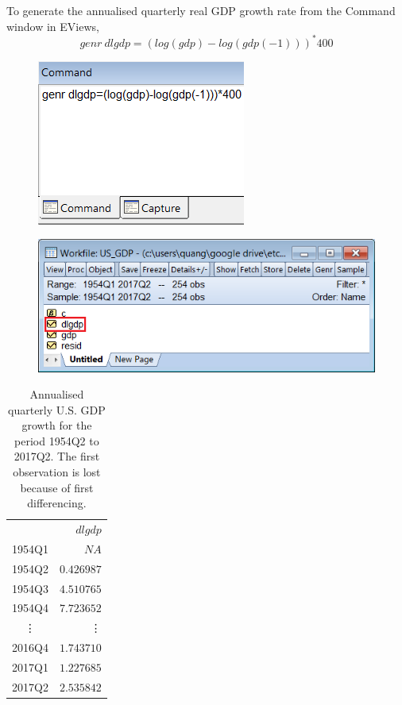 \documentclass[12pt]{report}
\begin{document}
\noindent To generate the annualised quarterly real GDP growth rate from the Command window in EViews, $$genr\ dlgdp=(log(gdp)-log(gdp(-1)))^*400$$
\begin{figure}[H]
	\centerline{\includegraphics{tute11_2}}
\end{figure}
\vspace{-\baselineskip}
\begin{figure}[H]
	\centerline{\includegraphics{tute11_3}}
\end{figure}
\vspace{-\baselineskip}


\begin{table}[H]
	\centering
	\begin{tabular}{lr}
		\multicolumn{1}{c}{}&\multicolumn{1}{r}{$dlgdp$}\\
		\multicolumn{1}{c}{1954Q1}&\multicolumn{1}{r}{$NA$}\\
		\multicolumn{1}{c}{1954Q2}&\multicolumn{1}{r}{$0.426987$}\\
		\multicolumn{1}{c}{1954Q3}&\multicolumn{1}{r}{$4.510765$}\\
		\multicolumn{1}{c}{1954Q4}&\multicolumn{1}{r}{$7.723652$}\\
		\multicolumn{1}{c}{\vdots}&\multicolumn{1}{r}{\vdots}\\
		\multicolumn{1}{c}{2016Q4}&\multicolumn{1}{r}{$1.743710$}\\
		\multicolumn{1}{c}{2017Q1}&\multicolumn{1}{r}{$1.227685$}\\
		\multicolumn{1}{c}{2017Q2}&\multicolumn{1}{r}{$2.535842$}\\
	\end{tabular}
	\caption{Annualised quarterly U.S. GDP growth for the period 1954Q2 to 2017Q2. The first observation is lost because of first differencing.}
\end{table}
\end{document}
